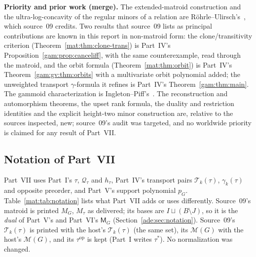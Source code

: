 \documentclass[11pt]{article}
\numberwithin{equation}{section}
\theoremstyle{definition}
\newcommand{\Qt}{\mathcal Q_\tau}
\newcommand{\PM}{\mathcal M}
\newcommand{\Tset}{\mathcal T}
\begin{document}
\begin{statusbox}
\small\textbf{Priority and prior work (merge).} The extended-matroid
construction and the ultra-log-concavity of the regular minors of a relation
are R\"ohrle--Ulirsch's~\cite{RU}, which source~09 credits. Two results that
source~09 lists as principal contributions are known in this report in
non-matroid form: the clone/transitivity criterion
(Theorem~\ref{mat:thm:clone-trans}) is Part~IV's
Proposition~\ref{gam:prop:canceliff}, with the same counterexample, read
through the matroid, and the orbit formula (Theorem~\ref{mat:thm:orbit}) is
Part~IV's Theorem~\ref{gam:gv:thm:orbits} with a multivariate orbit
polynomial added; the unweighted transport $\gamma$-formula it refines is
Part~IV's Theorem~\ref{gam:thm:main}. The gammoid characterization is
Ingleton--Piff's~\cite{IP}. The reconstruction and automorphism theorems,
the upset rank formula, the duality and restriction identities and the
explicit height-two minor construction are, relative to the sources
inspected, new; source~09's audit was targeted, and no worldwide priority is
claimed for any result of Part~VII.
\end{statusbox}

\subsection{Notation of Part~VII}
\label{mat:sec:notation}
Part~VII uses Part~I's $\tau$, $\Qt$ and $h_\tau$, Part~IV's transport pairs
$\Tset_k(\tau)$, $\gamma_k(\tau)$ and opposite preorder, and Part~V's support
polynomial $p_G$. Table~\ref{mat:tab:notation} lists what Part~VII adds or
uses differently. Source~09's matroid is printed $M_G$, $M_\tau$ as delivered;
its bases are $I\sqcup(B\setminus J)$, so it is the \emph{dual} of Part~V's and
Part~VI's $\mathsf M_G$ (Section~\ref{ade:sec:notation}). Source~09's
$\mathcal T_k(\tau)$ is printed with the host's $\Tset_k(\tau)$ (the same
set), its $\mathcal M(G)$ with the host's $\PM(G)$, and its
$\tau^{\mathrm{op}}$ is kept (Part~I writes $\tau^*$). No normalization was
changed.
\end{document}
